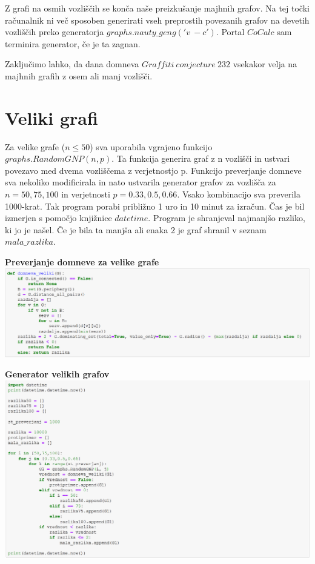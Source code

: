 \documentclass[10pt, a4paper]{article}
\begin{document}
Z grafi na osmih vozliščih se konča naše preizkušanje majhnih grafov. Na tej točki računalnik ni več sposoben generirati vseh preprostih povezanih grafov na devetih vozliščih preko generatorja  $graphs.nauty\_geng('v\ -c')$. Portal $CoCalc$ sam terminira generator, če je ta zagnan.

Zaključimo lahko, da dana domneva $Graffiti\ conjecture\ 232$ vsekakor velja na majhnih grafih z osem ali manj vozlišči.

\section{Veliki grafi}
Za velike grafe ($n\leq50$) sva uporabila vgrajeno funkcijo $graphs.RandomGNP(n,p)$. Ta funkcija generira graf z n vozlišči in ustvari povezavo med dvema vozliščema z verjetnostjo p. Funkcijo preverjanje domneve sva nekoliko modificirala in nato ustvarila generator grafov za vozlišča za $n=50,75,100$ in verjetnosti $p=0.33,0.5,0.66$. Vsako kombinacijo sva preverila 1000-krat. Tak program porabi približno 1 uro in 10 minut za izračun. Čas je bil izmerjen s pomočjo knjižnice $datetime$. Program je shranjeval najmanjšo razliko, ki jo je našel. Če je bila ta manjša ali enaka 2 je graf shranil v seznam $mala\_razlika$.

\begin{center}
\textbf{Preverjanje domneve za velike grafe}
\includegraphics[width=16cm]{domneva_veliki}
\end{center}

\pagebreak

\begin{center}
\textbf{Generator velikih grafov}
\includegraphics[width=16cm]{veliki_grafi}
\end{center}
\end{document}
